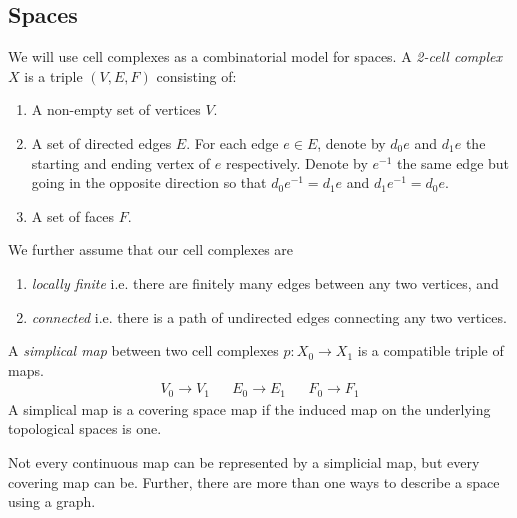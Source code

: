 \subsection{Spaces}
We will use cell complexes as a combinatorial model for spaces.
A \emph{2-cell complex} $X$ is a triple $(V, E, F)$ consisting of:
  \begin{enumerate}
    \item A non-empty set of vertices $V$.
    \item A set of directed edges $E$. For each edge $e \in E$, denote by $d_0 e$ and $d_1 e$ the starting and ending vertex of $e$ respectively. Denote by $e^{-1}$ the same edge but going in the opposite direction so that $d_0 e^{-1} = d_1 e$ and $d_1 e^{-1} = d_0 e$.
    \item A set of faces $F$.
  \end{enumerate}
  We further assume that our cell complexes are
  \begin{enumerate}
    \item \emph{locally finite} i.e. there are finitely many edges between any two vertices, and
    \item \emph{connected} i.e. there is a path of undirected edges connecting any two vertices.
  \end{enumerate}

A \emph{simplical map} between two cell complexes $p: X_0 \rightarrow X_1$ is a compatible triple of maps.
\begin{align*}
  V_0 \rightarrow V_1 && E_0 \rightarrow E_1 && F_0 \rightarrow F_1
\end{align*}
A simplical map is a covering space map if the induced map on the underlying topological spaces is one.

\begin{remark}
  Not every continuous map can be represented by a simplicial map, but every covering map can be. Further, there are more than one ways to describe a space using a graph.
\end{remark}






